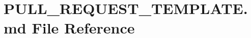 \hypertarget{PULL__REQUEST__TEMPLATE_8md}{}\section{P\+U\+L\+L\+\_\+\+R\+E\+Q\+U\+E\+S\+T\+\_\+\+T\+E\+M\+P\+L\+A\+T\+E.\+md File Reference}
\label{PULL__REQUEST__TEMPLATE_8md}
